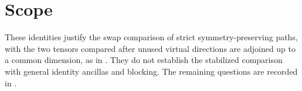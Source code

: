 \documentclass{article}
\begin{document}
\section{Scope}

These identities justify the swap comparison of strict symmetry-preserving
paths, with the two tensors compared after unused virtual directions are
adjoined up to a common dimension, as in
. They do not
establish the stabilized comparison with general identity ancillas and
blocking. The remaining questions are recorded in
.



\end{document}

